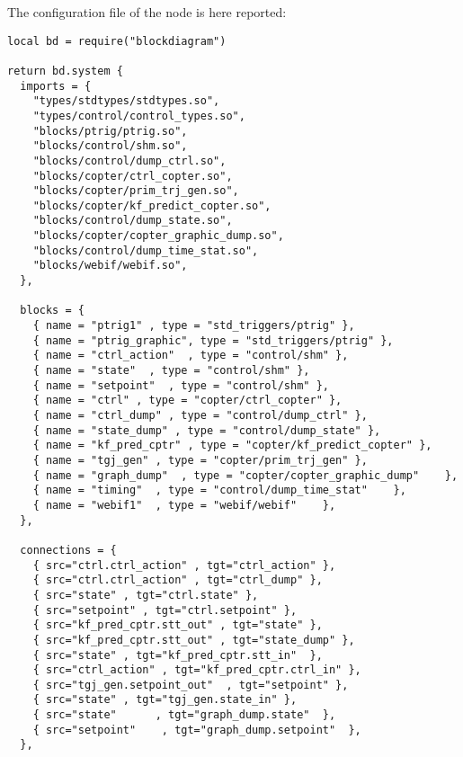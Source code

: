The configuration file of the node is here reported:
	
	
\begin{lstlisting}[language={[5.0]Lua},]
local bd = require("blockdiagram")

return bd.system {
  imports = {
    "types/stdtypes/stdtypes.so",
    "types/control/control_types.so",
    "blocks/ptrig/ptrig.so",
    "blocks/control/shm.so",
    "blocks/control/dump_ctrl.so",
    "blocks/copter/ctrl_copter.so",
    "blocks/copter/prim_trj_gen.so",
    "blocks/copter/kf_predict_copter.so",
    "blocks/control/dump_state.so",
    "blocks/copter/copter_graphic_dump.so",
    "blocks/control/dump_time_stat.so",
    "blocks/webif/webif.so",
  },

  blocks = {
    { name = "ptrig1" , type = "std_triggers/ptrig" },
    { name = "ptrig_graphic", type = "std_triggers/ptrig" },
    { name = "ctrl_action"  , type = "control/shm" },
    { name = "state"  , type = "control/shm" },
    { name = "setpoint"  , type = "control/shm" },
    { name = "ctrl" , type = "copter/ctrl_copter" },
    { name = "ctrl_dump" , type = "control/dump_ctrl" },
    { name = "state_dump" , type = "control/dump_state" },
    { name = "kf_pred_cptr" , type = "copter/kf_predict_copter" },
    { name = "tgj_gen" , type = "copter/prim_trj_gen" },
    { name = "graph_dump"  , type = "copter/copter_graphic_dump"    },
    { name = "timing"  , type = "control/dump_time_stat"    },
    { name = "webif1"  , type = "webif/webif"    },
  },

  connections = {
    { src="ctrl.ctrl_action" , tgt="ctrl_action" },
    { src="ctrl.ctrl_action" , tgt="ctrl_dump" },
    { src="state" , tgt="ctrl.state" },
    { src="setpoint" , tgt="ctrl.setpoint" },
    { src="kf_pred_cptr.stt_out" , tgt="state" },
    { src="kf_pred_cptr.stt_out" , tgt="state_dump" },
    { src="state" , tgt="kf_pred_cptr.stt_in"  },
    { src="ctrl_action" , tgt="kf_pred_cptr.ctrl_in" },
    { src="tgj_gen.setpoint_out"  , tgt="setpoint" },
    { src="state" , tgt="tgj_gen.state_in" },
    { src="state"      , tgt="graph_dump.state"  },
    { src="setpoint"    , tgt="graph_dump.setpoint"  },
  },


\end{lstlisting}
